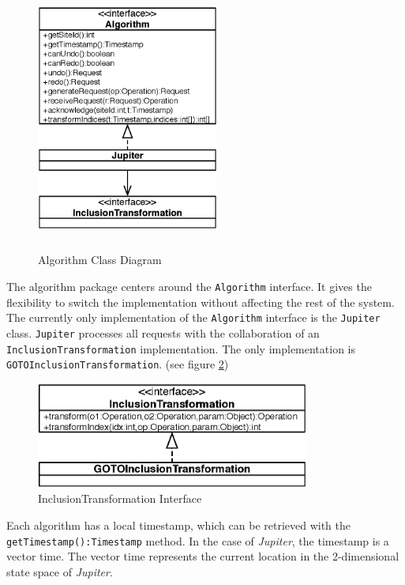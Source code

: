 \begin{figure}[H]
\centering
\includegraphics[width=6cm,height=8.78cm]{../images/finalreport/algorithm.eps}
\caption{Algorithm Class Diagram}
\label{fig:algorithm.uml}
\end{figure}

The algorithm package centers around the \texttt{Algorithm} interface.
It gives the flexibility to switch the implementation without affecting the 
rest of the system. The currently only implementation of the \texttt{Algorithm} 
interface is the \texttt{Jupiter} class. \texttt{Jupiter} processes 
all requests with the collaboration of an \texttt{InclusionTransformation}
implementation. The only implementation is \texttt{GOTOInclusionTransformation}. (see figure \ref{fig:algorithm.transformation.uml})

\begin{figure}
\centering
\includegraphics[width=9cm,height=3.49cm]{../images/finalreport/algorithm_transformation.eps}
\caption{InclusionTransformation Interface}
\label{fig:algorithm.transformation.uml}
\end{figure}

Each algorithm has a local timestamp, which can be retrieved with the
\texttt{getTimestamp():Timestamp} method. In the 
case of \emph{Jupiter}, the timestamp is a vector time. The vector 
time represents the current location in the 2-dimensional state space of 
\emph{Jupiter}. 


